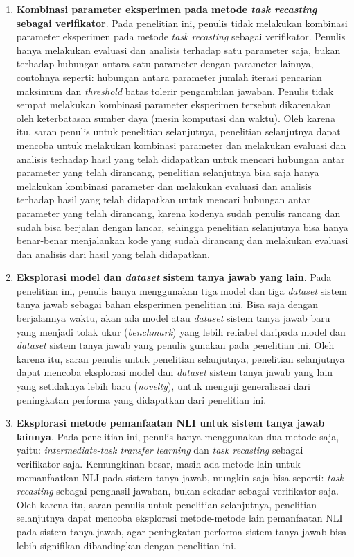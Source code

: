 \begin{enumerate}
    \item \textbf{Kombinasi parameter eksperimen pada metode \emph{task recasting} sebagai verifikator}. Pada penelitian ini, penulis tidak melakukan kombinasi parameter eksperimen pada metode \emph{task recasting} sebagai verifikator. Penulis hanya melakukan evaluasi dan analisis terhadap satu parameter saja, bukan terhadap hubungan antara satu parameter dengan parameter lainnya, contohnya seperti: hubungan antara parameter jumlah iterasi pencarian maksimum dan \emph{threshold} batas tolerir pengambilan jawaban. Penulis tidak sempat melakukan kombinasi parameter eksperimen tersebut dikarenakan oleh keterbatasan sumber daya (mesin komputasi dan waktu). Oleh karena itu, saran penulis untuk penelitian selanjutnya, penelitian selanjutnya dapat mencoba untuk melakukan kombinasi parameter dan melakukan evaluasi dan analisis terhadap hasil yang telah didapatkan untuk mencari hubungan antar parameter yang telah dirancang, penelitian selanjutnya bisa saja hanya melakukan kombinasi parameter dan melakukan evaluasi dan analisis terhadap hasil yang telah didapatkan untuk mencari hubungan antar parameter yang telah dirancang, karena kodenya sudah penulis rancang dan sudah bisa berjalan dengan lancar, sehingga penelitian selanjutnya bisa hanya benar-benar menjalankan kode yang sudah dirancang dan melakukan evaluasi dan analisis dari hasil yang telah didapatkan.
    
    \item \textbf{Eksplorasi model dan \emph{dataset} sistem tanya jawab yang lain}. Pada penelitian ini, penulis hanya menggunakan tiga model dan tiga \emph{dataset} sistem tanya jawab sebagai bahan eksperimen penelitian ini. Bisa saja dengan berjalannya waktu, akan ada model atau \emph{dataset} sistem tanya jawab baru yang menjadi tolak ukur (\emph{benchmark}) yang lebih reliabel daripada model dan \emph{dataset} sistem tanya jawab yang penulis gunakan pada penelitian ini. Oleh karena itu, saran penulis untuk penelitian selanjutnya, penelitian selanjutnya dapat mencoba eksplorasi model dan \emph{dataset} sistem tanya jawab yang lain yang setidaknya lebih baru (\emph{novelty}), untuk menguji generalisasi dari peningkatan performa yang didapatkan dari penelitian ini.
    
    \item \textbf{Eksplorasi metode pemanfaatan NLI 
    untuk sistem tanya jawab lainnya}. Pada penelitian ini, penulis hanya menggunakan dua metode saja, yaitu: \emph{intermediate-task transfer learning} dan \emph{task recasting} sebagai verifikator saja. Kemungkinan besar, masih ada metode lain untuk memanfaatkan NLI pada sistem tanya jawab, mungkin saja bisa seperti: \emph{task recasting} sebagai penghasil jawaban, bukan sekadar sebagai verifikator saja. Oleh karena itu, saran penulis untuk penelitian selanjutnya, penelitian selanjutnya dapat mencoba eksplorasi metode-metode lain pemanfaatan NLI pada sistem tanya jawab, agar peningkatan performa sistem tanya jawab bisa lebih signifikan dibandingkan dengan penelitian ini.


\end{enumerate}
